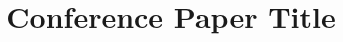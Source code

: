 \documentclass[conference]{IEEEtran}
\begin{document}
\title{Conference Paper Title}


\maketitle






% 



\nocite{*}


\end{document}
